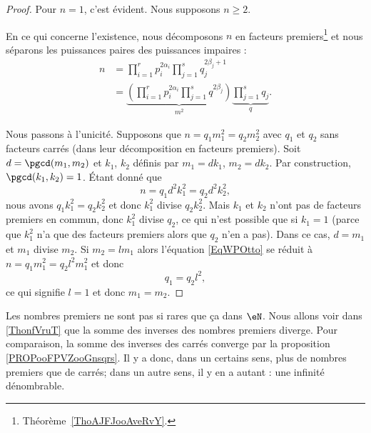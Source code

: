 \begin{proof}
	Pour \( n=1\), c'est évident. Nous supposons \( n\geq 2\).

	En ce qui concerne l'existence, nous décomposons \( n\) en facteurs premiers\footnote{Théorème~\ref{ThoAJFJooAveRvY}.} et nous séparons les puissances paires des puissances impaires :
	\begin{subequations}
		\begin{align}
			n & = \prod_{i=1}^r p_i^{2\alpha_i}\prod_{j=1}^sq_{j}^{2\beta_j+1}                                                              \\
			  & = \underbrace{\left( \prod_{i=1}^rp_i^{2\alpha_i}\prod_{j=1}^sq^{2\beta_j} \right)}_{m^2}\underbrace{\prod_{j=1}^sq_j}_{q}.
		\end{align}
	\end{subequations}

	Nous passons à l'unicité. Supposons que \( n=q_1m_1^2=q_2m_2^2\) avec \( q_1\) et \( q_2\) sans facteurs carrés (dans leur décomposition en facteurs premiers). Soit \( d=\pgcd(m_1,m_2)\) et \( k_1\), \( k_2\) définis par \( m_1=dk_1\), \( m_2=dk_2\). Par construction, \( \pgcd(k_1,k_2)=1\). Étant donné que
	\begin{equation}        \label{EqWPOtto}
		n=q_1d^2k_1^2=q_2d^2k_2^2,
	\end{equation}
	nous avons \( q_1k_1^2=q_2k_2^2\) et donc \( k_1^2\) divise \( q_2k_2^2\). Mais \( k_1\) et \( k_2\) n'ont pas de facteurs premiers en commun, donc \( k_1^2\) divise \( q_2\), ce qui n'est possible que si \( k_1=1\) (parce que \( k_1^2\) n'a que des facteurs premiers alors que \( q_2\) n'en a pas). Dans ce cas, \( d=m_1\) et \( m_1\) divise \( m_2\). Si \( m_2=lm_1\) alors l'équation \eqref{EqWPOtto} se réduit à  \( n=q_1m_1^2=q_2l^2m_1^2\) et donc
	\begin{equation}
		q_1=q_2l^2,
	\end{equation}
	ce qui signifie \( l=1\) et donc \( m_1=m_2\).
\end{proof}

Les nombres premiers ne sont pas si rares que ça dans \( \eN\). Nous allons voir dans \ref{ThonfVruT} que la somme des inverses des nombres premiers diverge. Pour comparaison, la somme des inverses des carrés converge par la proposition \ref{PROPooFPVZooGnsqrs}. Il y a donc, dans un certains sens, plus de nombres premiers que de carrés; dans un autre sens, il y en a autant : une infinité dénombrable.


